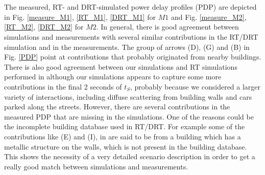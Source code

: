 \begin{figure*} [t]
    \captionsetup[subfigure]{font=scriptsize,labelfont=scriptsize}
    \centering
    \quad \quad \quad \quad
    \\
    \quad \quad \quad \quad
    \\
    \quad \quad \quad \quad
    \caption{Power Delay Profile obtained from measurements (a) and (b), from RT simulations (c) and (d) and from DRT prediction (e) and (f)}
    \label{PDP}
\end{figure*}

The measured, RT- and DRT-simulated power delay profiles (PDP) are depicted in Fig. \ref{measure_M1}, \ref{RT_M1}, \ref{DRT_M1} for $M1$ and Fig. \ref{measure_M2}, \ref{RT_M2}, \ref{DRT_M2} for $M2$. In general, there is good agreement between simulations and measurements with several similar contributions in the RT/DRT simulation and in the measurements. The group of arrows (D), (G) and (B) in Fig. \ref{PDP} point at contributions that probably originated from nearby buildings. There is also good agreement between our simulations and RT simulations performed in \cite{abbas} although our simulations appears to capture some more contributions in the final 2 seconds of $t_S$, probably because we considered a larger variety of interactions, including diffuse scattering from building walls and cars parked along the streets. However, there are several contributions in the measured PDP that are missing in the simulations. One of the reasons could be the incomplete building database used in RT/DRT. For example some of the contributions like (E) and (I), in \cite{abbas} are said to be from a building which has a metallic structure on the walls, which is not present in the building database.  This shows the necessity of a very detailed scenario description in order to get a really good match between simulations and measurements. \par

